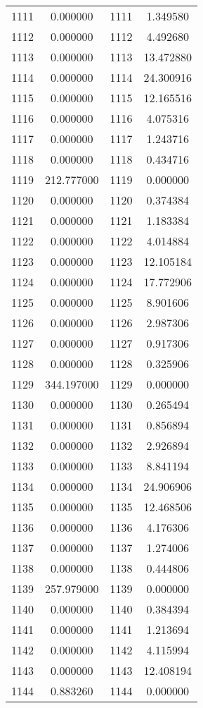 \documentclass[12pt]{article}
\begin{document}
\begin{longtable}{@{}cccc@{}}
1111 & 0.000000 & 1111 & 1.349580 \\
1112 & 0.000000 & 1112 & 4.492680 \\
1113 & 0.000000 & 1113 & 13.472880 \\
1114 & 0.000000 & 1114 & 24.300916 \\
1115 & 0.000000 & 1115 & 12.165516 \\
1116 & 0.000000 & 1116 & 4.075316 \\
1117 & 0.000000 & 1117 & 1.243716 \\
1118 & 0.000000 & 1118 & 0.434716 \\
1119 & 212.777000 & 1119 & 0.000000 \\
1120 & 0.000000 & 1120 & 0.374384 \\
1121 & 0.000000 & 1121 & 1.183384 \\
1122 & 0.000000 & 1122 & 4.014884 \\
1123 & 0.000000 & 1123 & 12.105184 \\
1124 & 0.000000 & 1124 & 17.772906 \\
1125 & 0.000000 & 1125 & 8.901606 \\
1126 & 0.000000 & 1126 & 2.987306 \\
1127 & 0.000000 & 1127 & 0.917306 \\
1128 & 0.000000 & 1128 & 0.325906 \\
1129 & 344.197000 & 1129 & 0.000000 \\
1130 & 0.000000 & 1130 & 0.265494 \\
1131 & 0.000000 & 1131 & 0.856894 \\
1132 & 0.000000 & 1132 & 2.926894 \\
1133 & 0.000000 & 1133 & 8.841194 \\
1134 & 0.000000 & 1134 & 24.906906 \\
1135 & 0.000000 & 1135 & 12.468506 \\
1136 & 0.000000 & 1136 & 4.176306 \\
1137 & 0.000000 & 1137 & 1.274006 \\
1138 & 0.000000 & 1138 & 0.444806 \\
1139 & 257.979000 & 1139 & 0.000000 \\
1140 & 0.000000 & 1140 & 0.384394 \\
1141 & 0.000000 & 1141 & 1.213694 \\
1142 & 0.000000 & 1142 & 4.115994 \\
1143 & 0.000000 & 1143 & 12.408194 \\
1144 & 0.883260 & 1144 & 0.000000 \\

\end{longtable}
\end{document}
